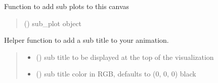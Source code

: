 \documentclass[letterpaper,10pt,english]{sphinxmanual}
\begin{document}
\begin{fulllineitems}
\begin{fulllineitems}
\label{\detokenize{index:sjvisualizer.Canvas.canvas.add_sub_plot}}
\pysigstartsignatures
{}
\pysigstopsignatures
\sphinxAtStartPar
Function to add sub plots to this canvas
\begin{quote}\begin{description}
\sphinxAtStartPar
{} ({\hyperref[\detokenize{index:sjvisualizer.Canvas.sub_plot}]{}}) \textendash{} sub\_plot object

\end{description}\end{quote}

\end{fulllineitems}


\begin{fulllineitems}
\label{\detokenize{index:sjvisualizer.Canvas.canvas.add_sub_title}}
\pysigstartsignatures
{}
\pysigstopsignatures
\sphinxAtStartPar
Helper function to add a sub title to your animation.
\begin{quote}\begin{description}
\begin{itemize}
\item {} 
\sphinxAtStartPar
{} () \textendash{} sub title to be displayed at the top of the visualization

\item {} 
\sphinxAtStartPar
{} () \textendash{} sub title color in RGB, defaults to (0, 0, 0) black

\end{itemize}

\end{description}\end{quote}


\end{fulllineitems}
\end{fulllineitems}
\end{document}
